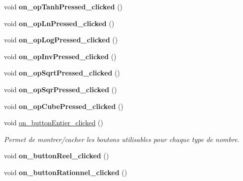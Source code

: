 \begin{DoxyCompactItemize}
\item 
\hypertarget{class_main_window_a40930fdd0ab99838b242813b216f1ae6}{void {\bfseries on\-\_\-op\-Tanh\-Pressed\-\_\-clicked} ()}\label{class_main_window_a40930fdd0ab99838b242813b216f1ae6}

\item 
\hypertarget{class_main_window_aeacfff56e51a5b69538028a8a71534f3}{void {\bfseries on\-\_\-op\-Ln\-Pressed\-\_\-clicked} ()}\label{class_main_window_aeacfff56e51a5b69538028a8a71534f3}

\item 
\hypertarget{class_main_window_a8136ae1398d1ac4305997fd878784d8c}{void {\bfseries on\-\_\-op\-Log\-Pressed\-\_\-clicked} ()}\label{class_main_window_a8136ae1398d1ac4305997fd878784d8c}

\item 
\hypertarget{class_main_window_aabafa83bbfca34fee377c2eab781c42e}{void {\bfseries on\-\_\-op\-Inv\-Pressed\-\_\-clicked} ()}\label{class_main_window_aabafa83bbfca34fee377c2eab781c42e}

\item 
\hypertarget{class_main_window_adc09b2c9d1277847cc95cbfe2c95c1a1}{void {\bfseries on\-\_\-op\-Sqrt\-Pressed\-\_\-clicked} ()}\label{class_main_window_adc09b2c9d1277847cc95cbfe2c95c1a1}

\item 
\hypertarget{class_main_window_a14cc64b16a04f2f0e83d38f30b7a527a}{void {\bfseries on\-\_\-op\-Sqr\-Pressed\-\_\-clicked} ()}\label{class_main_window_a14cc64b16a04f2f0e83d38f30b7a527a}

\item 
\hypertarget{class_main_window_aa8e0096b9fbef478c6783344eb37cc21}{void {\bfseries on\-\_\-op\-Cube\-Pressed\-\_\-clicked} ()}\label{class_main_window_aa8e0096b9fbef478c6783344eb37cc21}

\item 
void \hyperlink{class_main_window_a720967d84ad64cb148a52c548873ea49}{on\-\_\-button\-Entier\-\_\-clicked} ()
\begin{DoxyCompactList}\small\item\em Permet de montrer/cacher les boutons utilisables pour chaque type de nombre. \end{DoxyCompactList}\item 
\hypertarget{class_main_window_a8412167ca85bf946e912da85b0da2517}{void {\bfseries on\-\_\-button\-Reel\-\_\-clicked} ()}\label{class_main_window_a8412167ca85bf946e912da85b0da2517}

\item 
\hypertarget{class_main_window_a45f54befcfc3c873ec55a8890100c2e5}{void {\bfseries on\-\_\-button\-Rationnel\-\_\-clicked} ()}\label{class_main_window_a45f54befcfc3c873ec55a8890100c2e5}


\end{DoxyCompactItemize}
